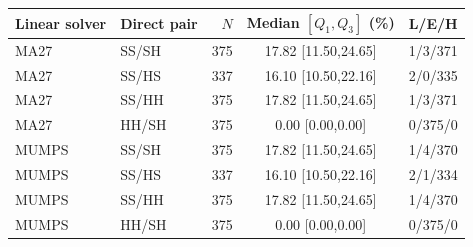 \begin{tabular}{@{}llrcc@{}}
\toprule
Linear solver & Direct pair & $N$ & Median $[Q_1,Q_3]$ (\%) & L/E/H\\
\midrule
MA27 & SS/SH & 375 & 17.82 [11.50,24.65] & 1/3/371\\
MA27 & SS/HS & 337 & 16.10 [10.50,22.16] & 2/0/335\\
MA27 & SS/HH & 375 & 17.82 [11.50,24.65] & 1/3/371\\
MA27 & HH/SH & 375 & 0.00 [0.00,0.00] & 0/375/0\\
\addlinespace
MUMPS & SS/SH & 375 & 17.82 [11.50,24.65] & 1/4/370\\
MUMPS & SS/HS & 337 & 16.10 [10.50,22.16] & 2/1/334\\
MUMPS & SS/HH & 375 & 17.82 [11.50,24.65] & 1/4/370\\
MUMPS & HH/SH & 375 & 0.00 [0.00,0.00] & 0/375/0\\
\bottomrule
\end{tabular}
